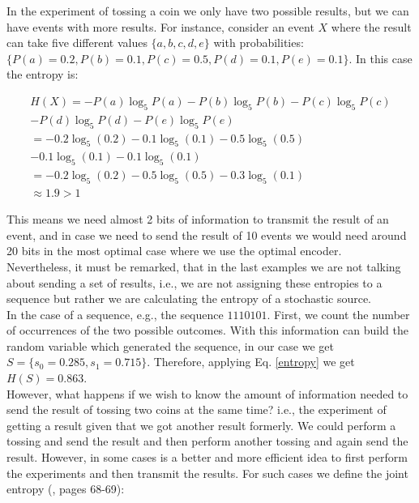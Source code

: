 In the experiment of tossing a coin we only have two possible results, but we can have events with more results. For instance, consider an event $X$ where the result can take five different values $\{a,b,c,d,e\}$ with probabilities: $\{P(a)=0.2,P(b)=0.1,P(c)=0.5,P(d)=0.1,P(e)=0.1\}$. In this case the entropy is:

\begin{align*}
  H(X)=-P(a)\log_{5}P(a)-P(b)\log_{5}P(b)-P(c)\log_{5}P(c)
  \\-P(d)\log_{5}P(d)-P(e)\log_{5}P(e)\\
      =-0.2\log_{5}(0.2)-0.1\log_{5}(0.1)-0.5\log_{5}(0.5)
      \\-0.1\log_{5}(0.1)-0.1\log_{5}(0.1)\\
      =-0.2\log_{5}(0.2)-0.5\log_{5}(0.5)-0.3\log_{5}(0.1)\\
      \approx 1.9>1
\end{align*}

This means we need almost 2 bits of information to transmit the result of an event, and in case we need to send the result of 10 events we would need around 20 bits in the most optimal case where we use the optimal encoder.\\

Nevertheless, it must be remarked, that in the last examples we are not talking about sending a set of results, i.e., we are not assigning these entropies to a sequence but rather we are calculating the entropy of a stochastic source.\\

In the case of a sequence, e.g., the sequence $1110101$. First, we count the number of occurrences of the two possible outcomes. With this information can build the random variable which generated the sequence, in our case we get $S=\{s_{0}=0.285,s_{1}=0.715 \}$. Therefore, applying Eq. \ref{entropy} we get $H(S)=0.863$.\\

However, what happens if we wish to know the amount of information needed to send the result of tossing two coins at the same time? i.e., the experiment of getting a result given that we got another result formerly. We could perform a tossing and send the result and then perform another tossing and again send the result. However, in some cases is a better and more efficient idea to first perform the experiments and then transmit the results. For such cases we define the joint entropy (\cite{kolmo_book}, pages 68-69):

